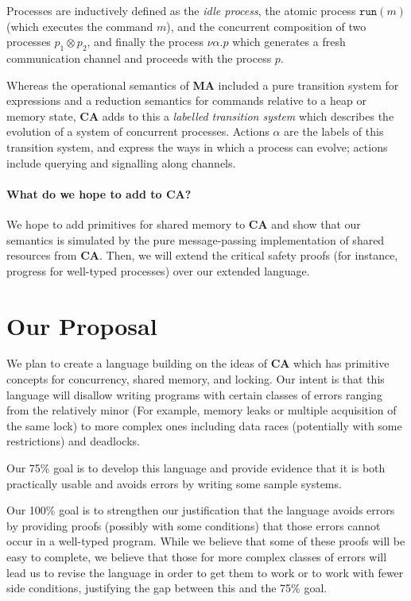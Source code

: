 \documentclass{article}
\newcommand\Lang[1]{{\sffamily\bfseries{#1}}}
\newcommand\LangCA{\Lang{CA}}
\newcommand\LangMA{\Lang{MA}}
\begin{document}
Processes are inductively defined as the \emph{idle process}, the
atomic process $\mathtt{run}(m)$ (which executes the command $m$), and
the concurrent composition of two processes $p_1\otimes p_2$, and
finally the process $\nu\alpha.p$ which generates a fresh
communication channel and proceeds with the process $p$.

Whereas the operational semantics of \LangMA{} included a pure
transition system for expressions and a reduction semantics for
commands relative to a heap or memory state, \LangCA{} adds to this a
\emph{labelled transition system} which describes the evolution of a
system of concurrent processes. Actions $\alpha$ are the labels of
this transition system, and express the ways in which a process can
evolve; actions include querying and signalling along channels.

\paragraph{What do we hope to add to \LangCA{}?}
We hope to add primitives for shared memory to \LangCA{} and show that
our semantics is simulated by the pure message-passing implementation
of shared resources from \LangCA{}. Then, we will extend the critical
safety proofs (for instance, progress for well-typed processes) over
our extended language.

\section{Our Proposal}

We plan to create a language building on the ideas of \LangCA{} which has primitive concepts for concurrency, shared memory, and locking.
Our intent is that this language will disallow writing programs with certain classes of errors ranging from the relatively minor (For example, memory leaks or multiple acquisition of the same lock) to more complex ones including data races (potentially with some restrictions) and deadlocks.

Our 75\% goal is to develop this language and provide evidence that it is both practically usable and avoids errors by writing some sample systems.

Our 100\% goal is to strengthen our justification that the language avoids errors by providing proofs (possibly with some conditions) that those errors cannot occur in a well-typed program.
While we believe that some of these proofs will be easy to complete, we believe that those for more complex classes of errors will lead us to revise the language in order to get them to work or to work with fewer side conditions, justifying the gap between this and the 75\% goal.
\end{document}
